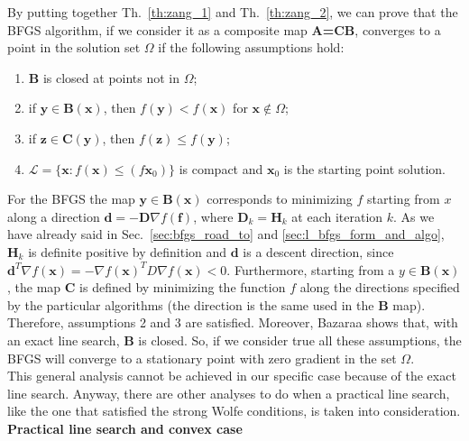 \documentclass[11pt]{article}
\begin{document}
By putting together Th.~\ref{th:zang_1} and Th.~\ref{th:zang_2}, we can prove that the BFGS algorithm, if we consider it as a composite map \textbf{A=CB}, converges to a point in the solution set $\Omega$ if the following assumptions hold:
\begin{enumerate}
    \item \textbf{B} is closed at points not in $\Omega$;
    \item if $\mathbf{y} \in \mathbf{B}(\mathbf{x})$, then $f(\mathbf{y}) < f(\mathbf{x})$ for $\mathbf{x} \notin \Omega$;
    \item if $\mathbf{z} \in \mathbf{C}(\mathbf{y})$, then $f(\mathbf{z}) \leq f(\mathbf{y})$;
    \item $\mathcal{L} = \{ \mathbf{x} :f(\mathbf{x}) \le (f\mathbf{x}_0)\}$ is compact and $\mathbf{x}_0$ is the starting point solution.
\end{enumerate}
For the BFGS the map $\mathbf{y} \in \mathbf{B}(\mathbf{x})$ corresponds to minimizing $f$ starting from $x$ along a direction $\mathbf{d} = -\mathbf{D}\nabla f(\mathbf{f})$, where $\mathbf{D}_k = \mathbf{H}_k$ at each iteration $k$. As we have already said in Sec.~\ref{sec:bfgs_road_to} and \ref{sec:l_bfgs_form_and_algo}, $\mathbf{H}_k$ is definite positive by definition and $\mathbf{d}$ is a descent direction, since $\mathbf{d}^T\nabla f(\mathbf{x}) = -\nabla f(\mathbf{x})^TD\nabla f(\mathbf{x}) < 0$. Furthermore, starting from a $y \in \mathbf{B}(\mathbf{x})$, the map \textbf{C} is defined by minimizing the function $f$ along the directions specified by the particular algorithms (the direction is the same used in the \textbf{B} map). Therefore, assumptions 2 and 3 are satisfied. Moreover, Bazaraa shows that, with an exact line search, \textbf{B} is closed. 
So, if we consider true all these assumptions, the BFGS will converge to a stationary point with zero gradient in the set $\Omega$.\\

This general analysis cannot be achieved in our specific case because of the exact line search. Anyway, there are other analyses to do when a practical line search, like the one that satisfied the strong Wolfe conditions, is taken into consideration.\\

\textbf{Practical line search and convex case}
\end{document}

